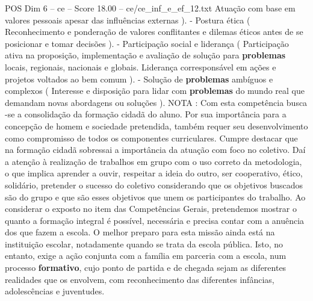 \begin{textsample}{POS Dim 6 – ce – Score 18.00 – ce/ce\_inf\_e\_ef\_12.txt}
Atuação com base em valores pessoais apesar das influências externas ). - Postura ética ( Reconhecimento e ponderação de valores conflitantes e dilemas éticos antes de se posicionar e tomar decisões ). - Participação social e liderança ( Participação ativa na proposição, implementação e avaliação de solução para \textbf{problemas} locais, regionais, nacionais e globais.
Liderança corresponsável em ações e projetos voltados ao bem comum ). - Solução de \textbf{problemas} ambíguos e complexos ( Interesse e disposição para lidar com \textbf{problemas} do mundo real que demandam novas abordagens ou soluções ).
NOTA : Com esta competência busca -se a consolidação da formação cidadã do aluno.
Por sua importância para a concepção de homem e sociedade pretendida, também requer seu desenvolvimento como compromisso de todos os componentes curriculares.
Cumpre destacar que na formação cidadã sobressai a importância da atuação com foco no coletivo.
Daí a atenção à realização de trabalhos em grupo com o uso correto da metodologia, o que implica aprender a ouvir, respeitar a ideia do outro, ser cooperativo, ético, solidário, pretender o sucesso do coletivo considerando que os objetivos buscados são do grupo e que são esses objetivos que unem os participantes do trabalho.
Ao considerar o exposto no item das Competências Gerais, pretendemos mostrar o quanto a formação integral é possível, necessária e precisa contar com a anuência dos que fazem a escola.
O melhor preparo para esta missão ainda está na instituição escolar, notadamente quando se trata da escola pública.
Isto, no entanto, exige a ação conjunta com a família em parceria com a escola, num processo \textbf{formativo}, cujo ponto de partida e de chegada sejam as diferentes realidades que os envolvem, com reconhecimento das diferentes infâncias, adolescências e juventudes.

\end{textsample}
